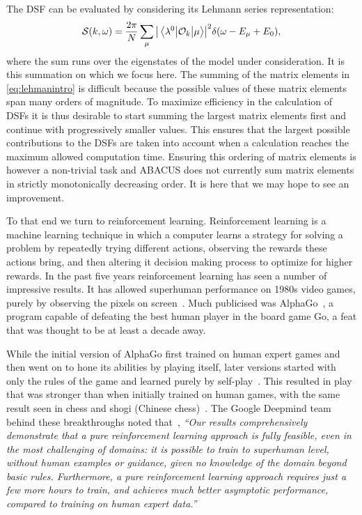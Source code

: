 \documentclass[11pt, a4paper]{report} %
\begin{document}
The DSF can be evaluated by considering its Lehmann series representation:
\begin{equation}\label{eq:lehmanintro}
  \mathcal{S}(k,\omega) = \frac{2\pi}{N}\sum_{\mu}\abs{\mel{\lambda^0}{\mathcal{O}_k}{\mu}}^2 \delta(\omega-E_{\mu}+E_0), 
\end{equation}
where the sum runs over the eigenstates of the model under consideration.
It is this summation on which we focus here.
The summing of the matrix elements in \cref{eq:lehmanintro} is difficult because the possible values of these matrix elements span many orders of magnitude.
To maximize efficiency in the calculation of DSFs it is thus desirable to start summing the largest matrix elements first and continue with progressively smaller values.
This ensures that the largest possible contributions to the DSFs are taken into account when a calculation reaches the maximum allowed computation time.
Ensuring this ordering of matrix elements is however a non-trivial task and ABACUS does not currently sum matrix elements in strictly monotonically decreasing order.
It is here that we may hope to see an improvement.

To that end we turn to reinforcement learning.
Reinforcement learning is a machine learning technique in which a computer learns a strategy for solving a problem by repeatedly trying different actions, observing the rewards these actions bring, and then altering it decision making process to optimize for higher rewards.
In the past five years reinforcement learning has seen a number of impressive results.
It has allowed superhuman performance on 1980s video games, purely by observing the pixels on screen~\cite{mnih13_playin_atari_with_deep_reinf_learn,mnih15_human_level_contr_throug_deep_reinf_learn}.
Much publicised was AlphaGo~\cite{silver16_master_game_go_with_deep}, a program capable of defeating the best human player in the board game Go, a feat that was thought to be at least a decade away.

While the initial version of AlphaGo first trained on human expert games and then went on to hone its abilities by playing itself, later versions started with only the rules of the game and learned purely by self-play~\cite{Silver2017a}.
This resulted in play that was stronger than when initially trained on human games, with the same result seen in chess and shogi (Chinese chess)~\cite{Silver2017}.
The Google Deepmind team behind these breakthroughs noted that~\cite{Silver2017a}, \textit{``Our results comprehensively demonstrate that a pure reinforcement learning approach is fully feasible, even in the most challenging of domains: it is possible to train to superhuman level, without human examples or guidance, given no knowledge of the domain beyond basic rules. Furthermore, a pure reinforcement learning approach requires just a few more hours to train, and achieves much better asymptotic performance, compared to training on human expert data.''}
\end{document}
